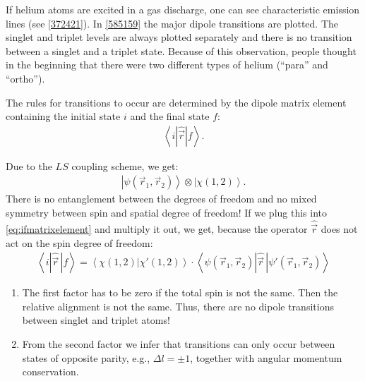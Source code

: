 \documentclass[10pt]{article}
\newcommand{\ket}[1]{\ensuremath{\left|#1\right\rangle}}
\newcommand{\braket}[1]{\ensuremath{\left\langle#1\right\rangle}}
\begin{document}
If helium atoms are excited in a gas discharge, one can see characteristic emission lines (see \ref{372421}).  In \ref{585159} the major dipole transitions are plotted. The singlet and triplet levels are always plotted separately and there is no transition between a singlet and a triplet state. Because of this observation, people thought in the beginning that there were two different types of helium (``para'' and ``ortho''). %

The rules for transitions to occur are determined by the dipole matrix element containing the initial state $i$ and the final state $f$:
\begin{align} \label{eq:ifmatrixelement}
\braket{i|\hat{\vec{r}}|f}.
\end{align}

Due to the $LS$ coupling scheme, we get: %
\begin{align}
\ket{\psi(\vec{r}_1, \vec{r}_2)} \otimes \ket{\chi (1,2)}.
\end{align}
There is no entanglement between the degrees of freedom and no mixed symmetry between spin and spatial degree of freedom! If we plug this into \eqref{eq:ifmatrixelement} and multiply it out, we get, because the operator $\hat{\vec{r}}$ does not act on the spin degree of freedom:
\begin{align}
\braket{i|\hat{\vec{r}}\,|f} = \braket{\chi(1,2) | \chi'(1,2)} \cdot \braket{\psi(\vec{r}_1, \vec{r}_2)|\hat{\vec{r}} \,| \psi'(\vec{r}_1, \vec{r}_2)}
\end{align}
\begin{enumerate}
\item The first factor has to be zero if the total spin is not the same. Then the relative alignment is not the same. Thus, there are no dipole transitions between singlet and triplet atoms!
\item From the second factor we infer that transitions can only occur between states of opposite parity, e.g., $\Delta l = \pm 1$, together with angular momentum conservation.
\end{enumerate}

\FloatBarrier


\end{document}
